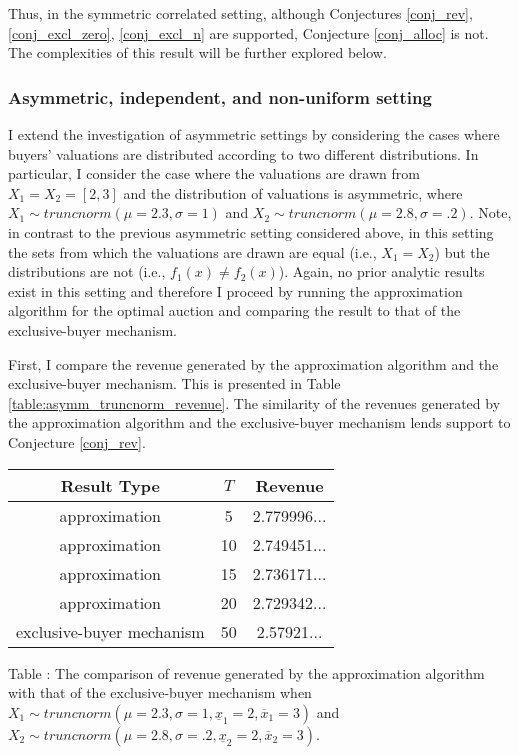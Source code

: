 Thus, in the symmetric correlated setting, although Conjectures \ref{conj_rev}, \ref{conj_excl_zero}, \ref{conj_excl_n} are supported, Conjecture \ref{conj_alloc} is not. The complexities of this result will be further explored below.







\subsubsection{Asymmetric, independent, and non-uniform setting}

I extend the investigation of asymmetric settings by considering the cases where buyers' valuations are distributed according to two different distributions. In particular, I consider the case where the valuations are drawn from $X_1 = X_2 = [2,3]$ and the distribution of valuations is asymmetric, where $X_1 \sim truncnorm(\mu=2.3, \sigma=1)$ and $X_2 \sim truncnorm(\mu=2.8, \sigma=.2)$. Note, in contrast to the previous asymmetric setting considered above, in this setting the sets from which the valuations are drawn are equal (i.e., $X_1 = X_2$) but the distributions are not (i.e., $f_1(x) \neq f_2(x)$). Again, no prior analytic results exist in this setting and therefore I proceed by running the approximation algorithm for the optimal auction and comparing the result to that of the exclusive-buyer mechanism.

First, I compare the revenue generated by the approximation algorithm and the exclusive-buyer mechanism. This is presented in Table \ref{table:asymm_truncnorm_revenue}. The similarity of the revenues generated by the approximation algorithm and the exclusive-buyer mechanism lends support to Conjecture \ref{conj_rev}.

\begin{center}
    \begin{tabular}{ |c|c|c| } 
    \hline
    Result Type & $T$ & Revenue \\
    \hline
    \hline
    approximation & 5 & 2.779996... \\ 
    approximation & 10 & 2.749451... \\ 
    approximation & 15 & 2.736171... \\ 
    approximation & 20 & 2.729342... \\ 
    exclusive-buyer mechanism & 50 & 2.57921... \\
    \hline
    \end{tabular}

    \vspace{1mm}
    \raggedright{\small {\sc Table \thefig\label{table:asymm_truncnorm_revenue}:} The comparison of revenue generated by the approximation algorithm with that of the exclusive-buyer mechanism when $X_1 \sim truncnorm(\mu=2.3, \sigma=1, \underline{x}_1=2, \overline{x}_1=3)$ and $X_2 \sim truncnorm(\mu=2.8, \sigma=.2, \underline{x}_2=2, \overline{x}_2=3)$.}
\end{center}

